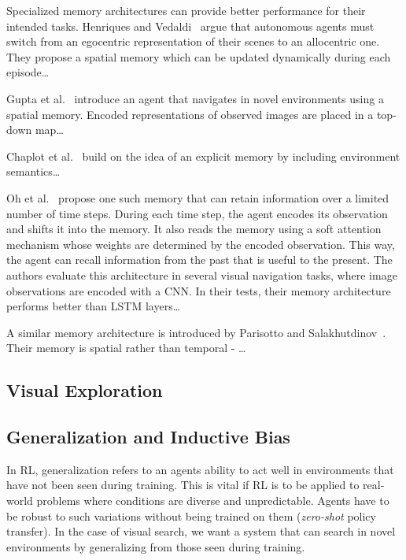 Specialized memory architectures can provide better performance for their intended tasks.
Henriques and Vedaldi~\cite{henriques_vedaldi_2018} argue that autonomous agents must switch from an egocentric representation of their scenes to an allocentric one.
They propose a spatial memory which can be updated dynamically during each episode\dots

Gupta et al.~\cite{gupta_cognitive_2019} introduce an agent that navigates in novel environments using a spatial memory.
Encoded representations of observed images are placed in a top-down map\dots

Chaplot et al.~\cite{chaplot_semantic_2020} build on the idea of an explicit memory by including environment semantics\dots

Oh et al.~\cite{oh_minecraft_2016} propose one such memory that can retain information over a limited number of time steps.
During each time step, the agent encodes its observation and shifts it into the memory.
It also reads the memory using a soft attention~\cite{bahdanau_attention_2016} mechanism whose weights are determined by the encoded observation.
This way, the agent can recall information from the past that is useful to the present.
The authors evaluate this architecture in several visual navigation tasks, where image observations are encoded with a CNN.
In their tests, their memory architecture performs better than LSTM layers\dots

A similar memory architecture is introduced by Parisotto and Salakhutdinov~\cite{parisotto_salakhutdinov_2017}.
Their memory is spatial rather than temporal - \dots


\subsection{Visual Exploration}


\subsection{Generalization and Inductive Bias}

In RL, generalization refers to an agents ability to act well in environments that have not been seen during training.
This is vital if RL is to be applied to real-world problems where conditions are diverse and unpredictable.
Agents have to be robust to such variations without being trained on them (\textit{zero-shot} policy transfer).
In the case of visual search, we want a system that can search in novel environments by generalizing from those seen during training.


